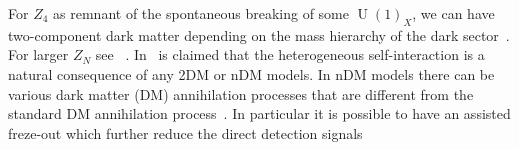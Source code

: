 \documentclass[prd,amsfonts,aps,nofootinbib,notitlepage,11pt,superscriptaddress]{revtex4-1}
\begin{document}
For $Z_4$ as remnant of the spontaneous breaking of some $\operatorname{U}(1)_X$,  we can have two-component dark matter depending on the mass hierarchy of the dark sector~\cite{Batell:2010bp,Aoki:2016glu}. For larger $Z_N$ see ~\cite{Batell:2010bp}. In~\cite{Chen:2018lsk} is claimed that the heterogeneous self-interaction is a natural consequence of any 2DM or nDM models. In nDM models there can be various dark matter (DM) annihilation processes that are different from the standard DM annihilation process~\cite{Aoki:2012ub}. In particular it is possible to have an assisted freze-out which further reduce the direct detection signals~\cite{Belanger:2011ww}



\end{document}
